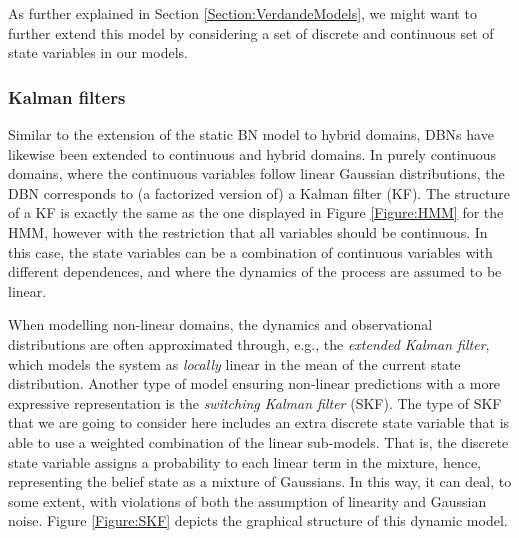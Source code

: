 As further explained in Section \ref{Section:VerdandeModels}, we might want to further extend this model by considering a set of discrete and continuous set of state variables in our models. 

\subsubsection{Kalman filters}\label{SubSubSection:KFs}

Similar to the extension of the static BN model to hybrid domains, DBNs have likewise been extended to continuous and hybrid domains. In purely continuous domains, where the continuous variables follow linear Gaussian distributions, the DBN corresponds to (a factorized version of) a Kalman filter (KF). The structure of a KF is exactly the same as the one displayed in Figure \ref{Figure:HMM} for the HMM, however with the restriction that all variables should be continuous. In this case, the state variables can be a combination of continuous variables with different dependences, and where the dynamics of the process are assumed to be linear. 

When modelling non-linear domains, the dynamics and observational distributions are often approximated through, e.g., the \textit{extended Kalman filter}, which models the system as \textit{locally} linear in the mean of the current state distribution. Another type of model ensuring non-linear predictions with a more expressive representation is the \textit{switching Kalman filter} (SKF). The type of SKF that we are going to consider here includes an extra discrete state variable that is able to use a weighted combination of the linear sub-models. That is, the discrete state variable assigns a probability to each linear term in the mixture, hence, representing the belief state as a mixture of Gaussians. In this way, it can deal, to some extent, with violations of both the assumption of linearity and Gaussian noise. Figure \ref{Figure:SKF} depicts the graphical structure of this dynamic model.

